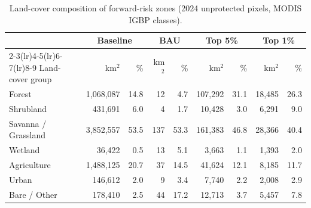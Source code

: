 \begin{table}[htbp]
  \centering
  \small
  \caption{Land-cover composition of forward-risk zones (2024 unprotected pixels, MODIS IGBP classes).}
  \label{tab:landcover_exposure}
  \begin{tabular}{lrrrrrrrr}
    \toprule
    & \multicolumn{2}{c}{Baseline} & \multicolumn{2}{c}{BAU} & \multicolumn{2}{c}{Top 5\%} & \multicolumn{2}{c}{Top 1\%} \\
    \cmidrule(lr){2-3}\cmidrule(lr){4-5}\cmidrule(lr){6-7}\cmidrule(lr){8-9}
    Land-cover group & km$^2$ & \% & km$^2$ & \% & km$^2$ & \% & km$^2$ & \% \\
    \midrule
    Forest & 1,068,087 & 14.8 & 12 & 4.7 & 107,292 & 31.1 & 18,485 & 26.3 \\
    Shrubland & 431,691 & 6.0 & 4 & 1.7 & 10,428 & 3.0 & 6,291 & 9.0 \\
    Savanna / Grassland & 3,852,557 & 53.5 & 137 & 53.3 & 161,383 & 46.8 & 28,366 & 40.4 \\
    Wetland & 36,422 & 0.5 & 13 & 5.1 & 3,663 & 1.1 & 1,393 & 2.0 \\
    Agriculture & 1,488,125 & 20.7 & 37 & 14.5 & 41,624 & 12.1 & 8,185 & 11.7 \\
    Urban & 146,612 & 2.0 & 9 & 3.4 & 7,740 & 2.2 & 2,008 & 2.9 \\
    Bare / Other & 178,410 & 2.5 & 44 & 17.2 & 12,713 & 3.7 & 5,457 & 7.8 \\
    \bottomrule
  \end{tabular}
\end{table}
